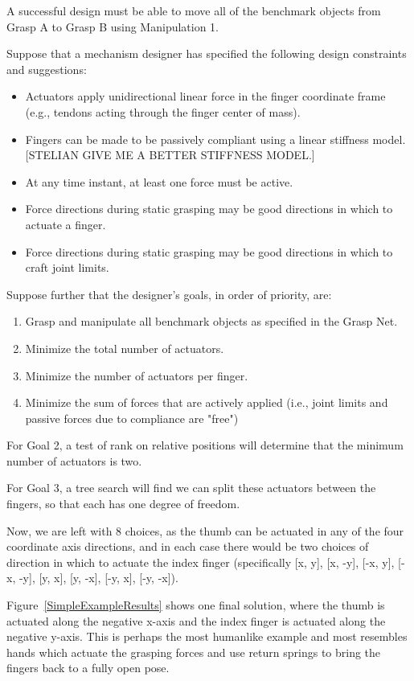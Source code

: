 A successful design must be able to move all of the benchmark objects from Grasp A to Grasp B using Manipulation 1.

Suppose that a mechanism designer has specified the following design constraints and suggestions:
\begin{itemize}
   \item Actuators apply unidirectional linear force in the finger coordinate frame (e.g., tendons acting through the finger center of mass).
   \item Fingers can be made to be passively compliant using a linear stiffness model.  [STELIAN GIVE ME A BETTER STIFFNESS MODEL.]
   \item At any time instant, at least one force must be active.
   \item Force directions during static grasping may be good directions in which to actuate a finger.
   \item Force directions during static grasping may be good directions in which to craft joint limits.
\end{itemize}

Suppose further that the designer's goals, in order of priority, are:
\begin{enumerate}
	\item Grasp and manipulate all benchmark objects as specified in the Grasp Net.
	\item Minimize the total number of actuators.
	\item Minimize the number of actuators per finger.
	\item Minimize the sum of forces that are actively applied (i.e., joint limits and passive forces due to compliance are "free")
\end{enumerate}

For Goal 2, a test of rank on relative positions will determine that the minimum number of actuators is two.

For Goal 3, a tree search will find we can split these actuators between the fingers, so that each has one degree of freedom.

Now, we are left with 8 choices, as the thumb can be actuated in any of the four coordinate axis directions, and in each case there would be two choices of direction in which to actuate the index finger (specifically [x, y], [x, -y], [-x, y], [-x, -y], [y, x], [y, -x], [-y, x], [-y, -x]).

Figure~\ref{SimpleExampleResults} shows one final solution, where the thumb is actuated along the negative x-axis and the index finger is actuated along the negative y-axis.   This is perhaps the most humanlike example and most resembles hands which actuate the grasping forces and use return springs to bring the fingers back to a fully open pose.   

